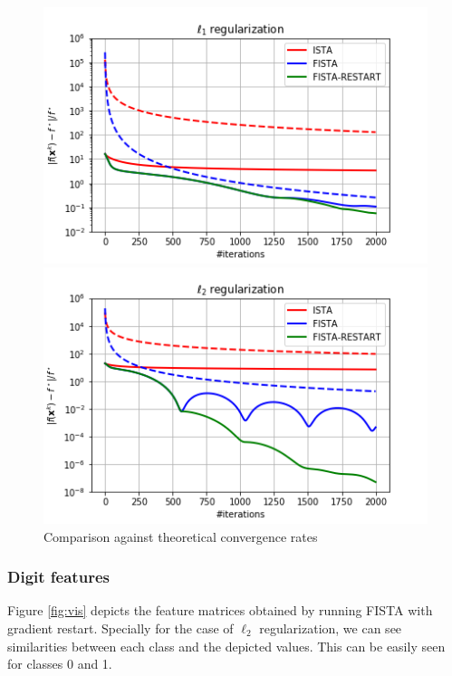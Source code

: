 \documentclass{article}
\begin{document}
\begin{figure}[ht]
    \centering
    \begin{minipage}{.45\textwidth}
        \includegraphics[width=\textwidth]{img/l1_reg.png}
    \end{minipage}
    \begin{minipage}{.45\textwidth}
        \includegraphics[width=\textwidth]{img/l2_reg.png}
    \end{minipage}
    \caption{Comparison against theoretical convergence rates}
    \label{fig:theo}
\end{figure}

\subsubsection*{Digit features}
Figure \ref{fig:vis} depicts the feature matrices obtained by running FISTA with gradient restart. Specially for the case of $\ell_2$ regularization, we can see similarities between each class and the depicted values. This can be easily seen for classes 0 and 1.
\end{document}
